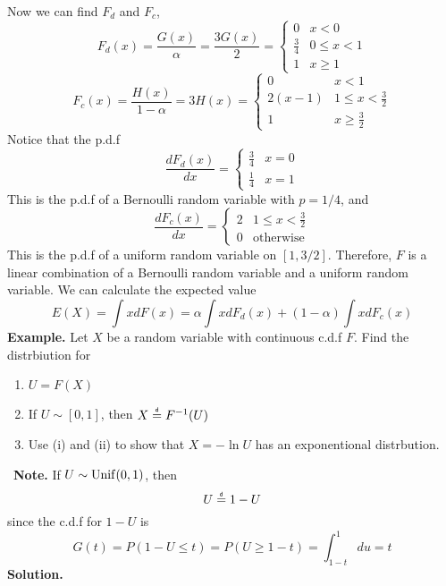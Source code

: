 Now we can find $F_d$ and $F_c$, 
\[F_d(x) = \frac{G(x)}{\alpha} = \frac{3G(x)}{2} = \begin{cases}
    0 & x < 0\\
    \frac{3}{4} & 0 \leq x < 1\\
    1 & x \geq 1
\end{cases}\]
\[F_c(x) = \frac{H(x)}{1 - \alpha} =  3H(x) = \begin{cases}
    0 & x <1\\
    2(x-1) & 1 \leq x < \frac{3}{2}\\
    1 & x \geq \frac{3}{2}
\end{cases}\]
Notice that the p.d.f
\[\frac{dF_d(x)}{dx} = \begin{cases}
    \frac{3}{4} & x = 0\\
    \frac{1}{4} & x = 1
\end{cases}
\]
This is the p.d.f of a Bernoulli random variable with $p = 1/4$, and 
\[\frac{dF_c(x)}{dx} = \begin{cases}
    2 & 1 \leq x < \frac{3}{2}\\
    0 & \text{otherwise}
\end{cases}\]
This is the p.d.f of a uniform random variable on $[1,3/2]$. Therefore, $F$ is a linear combination of a Bernoulli random variable and a uniform random variable. We can calculate the expected value 
\[E(X) = \int xdF(x) = \alpha \int x dF_d(x) + (1-\alpha)\int x dF_c(x)\]
\textbf{Example.} Let $X$ be a random variable with continuous c.d.f $F$. Find the distrbiution for 
\begin{enumerate}[label=(\roman*)]
    \item $U = F(X)$
    \item If $U \sim [0,1]$, then $X \eqd F^{-1}(U)$
    \item Use (i) and (ii) to show that $X = -\ln U$ has an exponentional distrbution. 
\end{enumerate}\
\textbf{Note.} If $U \sim \operatorname{Unif}(0,1)$, then 
\[U \eqd 1 - U\]
since the c.d.f for $1 - U$ is 
\[G(t) = P(1 - U \leq t) = P(U \geq 1 - t) = \int_{1-t}^1 du = t\]
\textbf{Solution.} 
